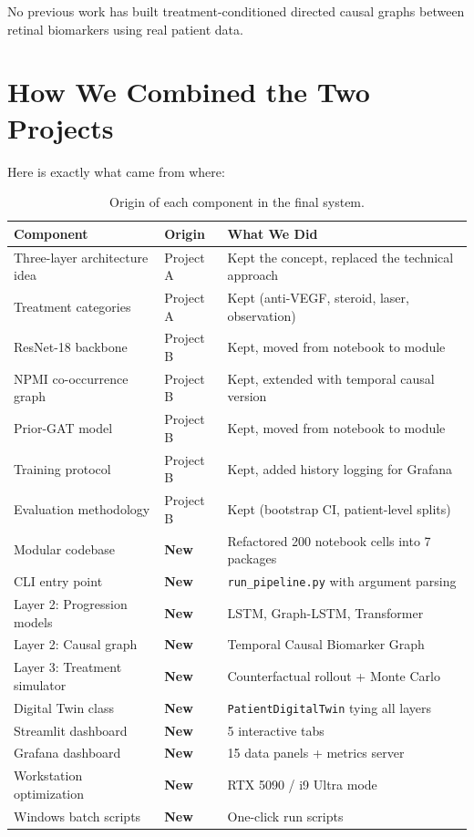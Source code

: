 \documentclass[12pt,a4paper]{article}
\begin{document}
No previous work has built treatment-conditioned directed causal graphs between retinal biomarkers using real patient data.


\section{How We Combined the Two Projects}

Here is exactly what came from where:

\begin{table}[H]
\centering
\caption{Origin of each component in the final system.}
\small
\begin{tabular}{@{}lll@{}}
\toprule
\textbf{Component} & \textbf{Origin} & \textbf{What We Did} \\
\midrule
Three-layer architecture idea & Project A & Kept the concept, replaced the technical approach \\
Treatment categories & Project A & Kept (anti-VEGF, steroid, laser, observation) \\
ResNet-18 backbone & Project B & Kept, moved from notebook to module \\
NPMI co-occurrence graph & Project B & Kept, extended with temporal causal version \\
Prior-GAT model & Project B & Kept, moved from notebook to module \\
Training protocol & Project B & Kept, added history logging for Grafana \\
Evaluation methodology & Project B & Kept (bootstrap CI, patient-level splits) \\
\addlinespace
Modular codebase & \textbf{New} & Refactored 200 notebook cells into 7 packages \\
CLI entry point & \textbf{New} & \texttt{run\_pipeline.py} with argument parsing \\
Layer 2: Progression models & \textbf{New} & LSTM, Graph-LSTM, Transformer \\
Layer 2: Causal graph & \textbf{New} & Temporal Causal Biomarker Graph \\
Layer 3: Treatment simulator & \textbf{New} & Counterfactual rollout + Monte Carlo \\
Digital Twin class & \textbf{New} & \texttt{PatientDigitalTwin} tying all layers \\
Streamlit dashboard & \textbf{New} & 5 interactive tabs \\
Grafana dashboard & \textbf{New} & 15 data panels + metrics server \\
Workstation optimization & \textbf{New} & RTX 5090 / i9 Ultra mode \\
Windows batch scripts & \textbf{New} & One-click run scripts \\
\bottomrule
\end{tabular}
\end{table}
\end{document}
